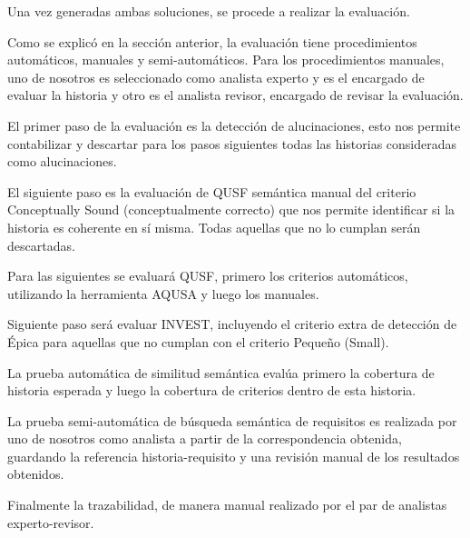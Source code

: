 Una vez generadas ambas soluciones, se procede a realizar la evaluación.

Como se explicó en la sección anterior, la evaluación tiene procedimientos automáticos, manuales y semi-automáticos. Para los procedimientos manuales, uno de nosotros es seleccionado como analista experto y es el encargado de evaluar la historia y otro es el analista revisor, encargado de revisar la evaluación.

El primer paso de la evaluación es la detección de alucinaciones, esto nos permite contabilizar y descartar para los pasos siguientes todas las historias consideradas como alucinaciones.

El siguiente paso es la evaluación de QUSF semántica manual del criterio Conceptually Sound (conceptualmente correcto) que nos permite identificar si la historia es coherente en sí misma. Todas aquellas que no lo cumplan serán descartadas.

Para las siguientes se evaluará QUSF, primero los criterios automáticos, utilizando la herramienta AQUSA \cite{aqusa} y luego los manuales. 

Siguiente paso será evaluar INVEST, incluyendo el criterio extra de detección de Épica para aquellas que no cumplan con el criterio Pequeño (Small).

La prueba automática de similitud semántica evalúa primero la cobertura de historia esperada y luego la cobertura de criterios dentro de esta historia.

La prueba semi-automática de búsqueda semántica de requisitos es realizada por uno de nosotros como analista a partir de la correspondencia obtenida, guardando la referencia historia-requisito y una revisión manual de los resultados obtenidos.

Finalmente la trazabilidad, de manera manual realizado por el par de analistas experto-revisor.